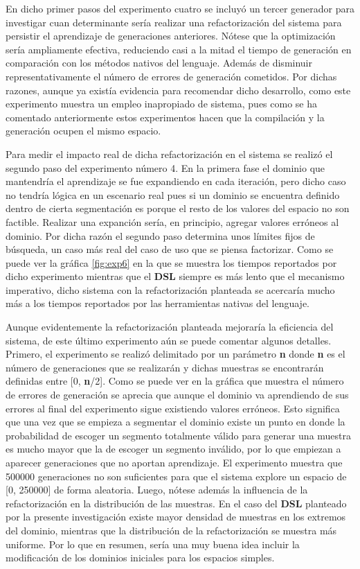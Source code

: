 En dicho primer pasos del experimento cuatro se incluyó un tercer generador para investigar cuan determinante sería
realizar una refactorización del sistema para persistir el aprendizaje de generaciones anteriores. Nótese que la optimización
sería ampliamente efectiva, reduciendo casi a la mitad el tiempo de generación en comparación con los métodos nativos del
lenguaje. Además de disminuir representativamente el número de errores de generación cometidos. Por dichas
razones, aunque ya existía evidencia para recomendar dicho desarrollo, como este experimento muestra un empleo inapropiado de
sistema, pues como se ha comentado anteriormente estos experimentos hacen que la compilación y la generación ocupen el mismo
espacio.

Para medir el impacto real de dicha refactorización en el sistema se realizó el segundo paso del experimento número 4. En la
primera fase el dominio que mantendría el aprendizaje se fue expandiendo en cada iteración, pero dicho caso no tendría lógica
en un escenario real pues si un dominio se encuentra definido dentro de cierta segmentación es porque el resto de los valores
del espacio no son factible. Realizar una expanción sería, en principio, agregar valores erróneos al dominio. Por dicha razón
el segundo paso determina unos límites fijos de búsqueda, un caso más real del caso de uso que se piensa factorizar. Como se
puede ver la gráfica \ref{fig:exp6} en la que se muestra los tiempos reportados por dicho experimento mientras que el {\bf DSL} siempre es más lento
que el mecanismo imperativo, dicho sistema con la refactorización planteada se acercaría mucho más a los tiempos reportados por
las herramientas nativas del lenguaje.

Aunque evidentemente la refactorización planteada mejoraría la eficiencia del sistema, de este último experimento aún se puede
comentar algunos detalles. Primero, el experimento se realizó delimitado por un parámetro {\bf n} donde {\bf n} es el número de generaciones
que se realizarán y dichas muestras se encontrarán definidas entre [0, {\bf n}/2]. Como se puede ver en la gráfica que muestra el
número de errores de generación se aprecia que aunque el dominio va aprendiendo de sus errores al final del experimento sigue
existiendo valores erróneos. Esto significa que una vez que se empieza a segmentar el dominio existe un punto en donde la
probabilidad de escoger un segmento totalmente válido para generar una muestra es mucho mayor que la de escoger un segmento
inválido, por lo que empiezan a aparecer generaciones que no aportan aprendizaje. El experimento muestra que 500000
generaciones no son suficientes para que el sistema explore un espacio de [0, 250000] de forma aleatoria.
Luego, nótese además la influencia de la refactorización en la distribución de las muestras. En el caso del {\bf DSL} planteado
por la presente investigación existe mayor densidad de muestras en los extremos del dominio, mientras que la distribución
de la refactorización se muestra más uniforme. Por lo que en resumen, sería una muy buena idea incluir la modificación de los
dominios iniciales para los espacios simples.

